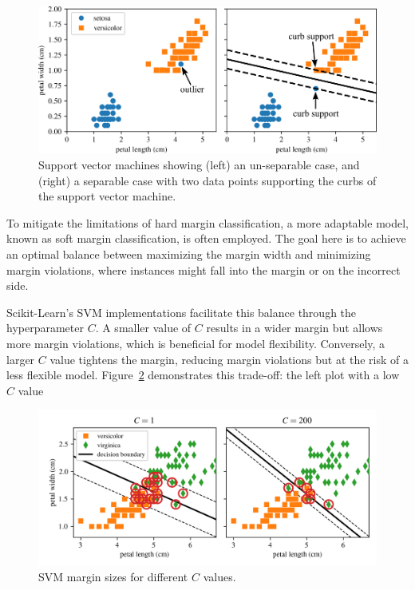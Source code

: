 \documentclass[12pt,letter]{article}
\begin{document}
\begin{figure}[H]
	\centering
	\includegraphics[width=6.5in]{../figures/SVM_hard_margin.png}
	\caption{Support vector machines showing (left) an un-separable case, and (right) a separable case with two data points supporting the curbs of the support vector machine. }
	\label{fig:SVM_hard_margin}
\end{figure}


To mitigate the limitations of hard margin classification, a more adaptable model, known as soft margin classification, is often employed. The goal here is to achieve an optimal balance between maximizing the margin width and minimizing margin violations, where instances might fall into the margin or on the incorrect side.

Scikit-Learn's SVM implementations facilitate this balance through the hyperparameter $C$. A smaller value of $C$ results in a wider margin but allows more margin violations, which is beneficial for model flexibility. Conversely, a larger $C$ value tightens the margin, reducing margin violations but at the risk of a less flexible model. Figure~\ref{fig:SVM_hyperparameter_C} demonstrates this trade-off: the left plot with a low $C$ value

\begin{figure}[H]
	\centering
	\includegraphics[width=6.5in]{../figures/SVM_hyperparameter_C.png}
	\caption{SVM margin sizes for different $C$ values.}
	\label{fig:SVM_hyperparameter_C}
\end{figure}
\end{document}
